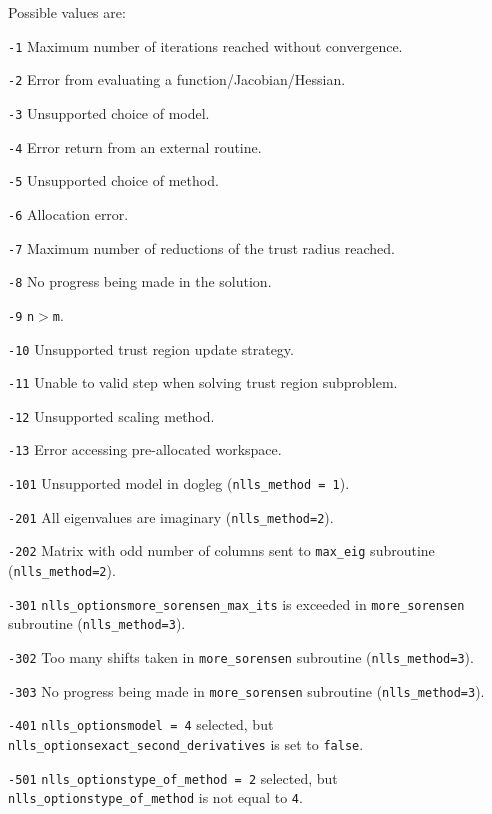 
Possible values are:
\begin{description}
\item{} {\tt -1} Maximum number of iterations reached without convergence.
\item{} {\tt -2} Error from evaluating a function/Jacobian/Hessian.
\item{} {\tt -3} Unsupported choice of model.
\item{} {\tt -4} Error return from an external routine.
\item{} {\tt -5} Unsupported choice of method.
\item{} {\tt -6} Allocation error.
\item{} {\tt -7} Maximum number of reductions of the trust radius reached.
\item{} {\tt -8} No progress being made in the solution.
\item{} {\tt -9} \texttt{n}$>$\texttt{m}.
\item{} {\tt -10} Unsupported trust region update strategy.
\item{} {\tt -11} Unable to valid step when solving trust region subproblem.
\item{} {\tt -12} Unsupported scaling method.
\item{} {\tt -13} Error accessing pre-allocated workspace.
\item{} {\tt -101} Unsupported model in dogleg (\texttt{nlls\_method = 1}).
\item{} {\tt -201}  All eigenvalues are imaginary (\texttt{nlls\_method=2}).
\item{} {\tt -202} Matrix with odd number of columns sent to \texttt{max\_eig} subroutine (\texttt{nlls\_method=2}).
\item{} {\tt -301} {\tt nlls\_options\ct more\_sorensen\_max\_its} is exceeded in \texttt{more\_sorensen} subroutine (\texttt{nlls\_method=3}).
\item{} {\tt -302} Too many shifts taken in \texttt{more\_sorensen} subroutine (\texttt{nlls\_method=3}).
\item{} {\tt -303} No progress being made in \texttt{more\_sorensen} subroutine (\texttt{nlls\_method=3}).
\item{} {\tt -401} {\tt nlls\_options\ct model = 4} selected, but {\tt nlls\_options\ct exact\_second\_derivatives} is set to {\tt false}. 
\item{} {\tt -501} {\tt nlls\_options\ct type\_of\_method = 2} selected, but {\tt nlls\_options\ct type\_of\_method} is not equal to {\tt 4}.
\end{description}
